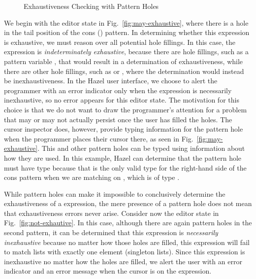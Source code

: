 \begin{figure}
{}
\hfil
  \caption{Exhaustiveness Checking with Pattern Holes}
  \label{fig:exhaustiveness}
\end{figure}

We begin with the editor state in Fig.~\ref{fig:may-exhaustive}, 
where there is a hole in the tail position of the cons (\li{::}) pattern.
In determining whether this  expression is exhaustive, we 
must reason over all potential hole fillings. In this case, the 
 expression is \emph{indeterminately exhaustive}, because there are hole fillings,
such as a pattern variable , that would result in a determination
of exhaustiveness, while there are other hole fillings, such as \li{[]} or ,
where the determination would instead be inexhaustiveness. In the Hazel user interface, we choose to alert the programmer with an error
indicator only when the  expression is necessarily inexhaustive,
so no error appears for this editor state. The motivation for this choice is that we do not want to draw the programmer's attention for a problem that may or may not actually persist once the user has filled the holes. The cursor inspector does, however, provide typing information for the pattern hole when the programmer places their cursor there, as seen in Fig.~\ref{fig:may-exhaustive}. This and other pattern holes can be typed using information about how they are used. In this example, Hazel can determine that the pattern hole must have type \li{[Int]} because that is the only valid type for the right-hand side of the cons pattern when we are matching on , which is of type \li{[Int]}.

While pattern holes can make it impossible to conclusively determine the exhaustiveness of a  expression, the mere presence of a pattern hole does not mean that exhaustiveness errors never arise. Consider now
the editor state in Fig.~\ref{fig:not-exhautive}. In this case,
although there are again pattern holes in the second pattern, 
it can be determined that this  expression is \emph{necessarily inexhaustive}
because no matter how those holes are filled, this  expression will fail to 
match lists with exactly one element (singleton lists). Since this  expression is inexhaustive no matter how the holes are filled,
we alert the user with an error indicator and an error message when the cursor is on the  expression.


